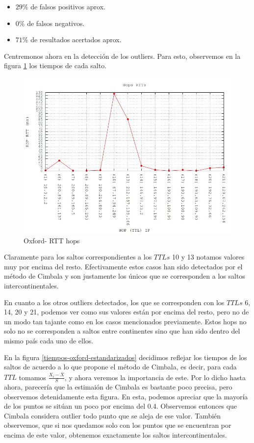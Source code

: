 \begin{itemize}
	\item $29 \% $ de falsos positivos aprox.
	\item $0 \%$ de falsos negativos.
	\item $71 \%$ de resultados acertados aprox.
\end{itemize}

Centremonos ahora en la detección de los outliers. Para esto, observemos en la figura \ref{tiempos-oxford} los tiempos de cada salto.

\begin{figure}[!htbp]
  \centering
    \includegraphics[scale=0.5]{imagenes/oxford-graficos/traceroute-oxford.jpg}
  \caption{Oxford- RTT hops}
  \label{tiempos-oxford}
\end{figure}


Claramente para los saltos correspondientes a los $TTLs$ 10 y 13 notamos valores muy por encima del resto. Efectivamente estos casos han sido detectados por el método de Cimbala y son justamente los únicos que se corresponden a los saltos intercontinentales.

En cuanto a los otros outliers detectados, los que se corresponden con los $TTLs$ 6, 14, 20 y 21, podemos ver como sus valores están por encima del resto, pero no de un modo tan tajante como en los casos mencionados previamente. Estos hops no solo no se corresponden a saltos entre continentes sino que han sido dentro del mismo país cada uno de ellos.


En la figura \ref{tiempos-oxford-estandarizados} decidimos reflejar los tiempos de los saltos de acuerdo a lo que propone el método de Cimbala, es decir, para cada $TTL$ tomamos $\frac{X_i - \bar{X}}{S}$, y ahora veremos la importancia de este. Por lo dicho hasta ahora, parecería que la estimaión de Cimbala es bastante poco precisa, pero observemos detenidamente esta figura. En esta, podemos apreciar que la mayoría de los puntos se sitúan un poco por encima del 0.4. Observemos entonces que Cimbala considera outlier todo  punto que se aleja de ese valor. También observemos, que si nos quedamos solo con los puntos que se encuentran por encima de este valor, obtenemos exactamente los saltos intercontinentales.


